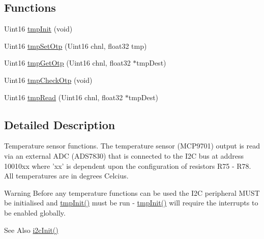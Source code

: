 \subsection*{Functions}
\begin{DoxyCompactItemize}
\item 
Uint16 \hyperlink{a00042_a4f10186d5fb8a3069cc30c9d0c7e716f}{tmp\-Init} (void)
\item 
Uint16 \hyperlink{a00042_a10e85d2f2d7cce42822ea65e69601dfa}{tmp\-Set\-Otp} (Uint16 chnl, float32 tmp)
\item 
Uint16 \hyperlink{a00042_a9aedec904a421fed1823a16846b7841d}{tmp\-Get\-Otp} (Uint16 chnl, float32 $\ast$tmp\-Dest)
\item 
Uint16 \hyperlink{a00042_adf839085f18308f90ee198a96bbac364}{tmp\-Check\-Otp} (void)
\item 
Uint16 \hyperlink{a00042_a3f542f4bc433dfd2c1073a5e8308f99f}{tmp\-Read} (Uint16 chnl, float32 $\ast$tmp\-Dest)
\end{DoxyCompactItemize}


\subsection{Detailed Description}
Temperature sensor functions. The temperature sensor (M\-C\-P9701) output is read via an external A\-D\-C (A\-D\-S7830) that is connected to the I2\-C bus at address 10010xx where 'xx' is dependent upon the configuration of resistors R75 -\/ R78. All temperatures are in degrees Celcius.

\begin{DoxyWarning}{Warning}
Before any temperature functions can be used the I2\-C peripheral M\-U\-S\-T be initialised and \hyperlink{a00042_a4f10186d5fb8a3069cc30c9d0c7e716f}{tmp\-Init()} must be run -\/ \hyperlink{a00042_a4f10186d5fb8a3069cc30c9d0c7e716f}{tmp\-Init()} will require the interrupts to be enabled globally.
\end{DoxyWarning}
\begin{DoxySeeAlso}{See Also}
\hyperlink{a00019_a1e0a81a1ad1fd7710ca189236e3e5476}{i2c\-Init()} 
\end{DoxySeeAlso}


